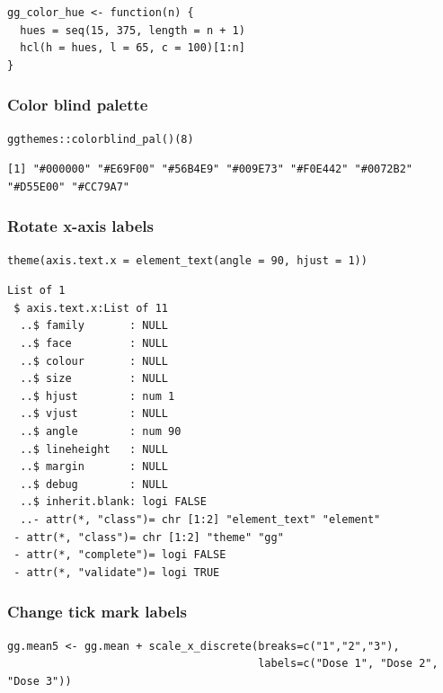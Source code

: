 \documentclass{article}
\begin{document}
\lstset{language=r,label= ,caption= ,captionpos=b,numbers=none}
\begin{lstlisting}
gg_color_hue <- function(n) {
  hues = seq(15, 375, length = n + 1)
  hcl(h = hues, l = 65, c = 100)[1:n]
}
\end{lstlisting}

\subsubsection{Color blind palette}
\label{sec:orgf4b45dc}
\lstset{language=r,label= ,caption= ,captionpos=b,numbers=none}
\begin{lstlisting}
ggthemes::colorblind_pal()(8)
\end{lstlisting}

\begin{verbatim}
[1] "#000000" "#E69F00" "#56B4E9" "#009E73" "#F0E442" "#0072B2" "#D55E00" "#CC79A7"
\end{verbatim}

\subsubsection{Rotate x-axis labels}
\label{sec:orgc3f6c24}
\lstset{language=r,label= ,caption= ,captionpos=b,numbers=none}
\begin{lstlisting}
theme(axis.text.x = element_text(angle = 90, hjust = 1))
\end{lstlisting}

\begin{verbatim}
List of 1
 $ axis.text.x:List of 11
  ..$ family       : NULL
  ..$ face         : NULL
  ..$ colour       : NULL
  ..$ size         : NULL
  ..$ hjust        : num 1
  ..$ vjust        : NULL
  ..$ angle        : num 90
  ..$ lineheight   : NULL
  ..$ margin       : NULL
  ..$ debug        : NULL
  ..$ inherit.blank: logi FALSE
  ..- attr(*, "class")= chr [1:2] "element_text" "element"
 - attr(*, "class")= chr [1:2] "theme" "gg"
 - attr(*, "complete")= logi FALSE
 - attr(*, "validate")= logi TRUE
\end{verbatim}

\subsubsection{Change tick mark labels}
\label{sec:org61b51de}

\lstset{language=r,label= ,caption= ,captionpos=b,numbers=none}
\begin{lstlisting}
gg.mean5 <- gg.mean + scale_x_discrete(breaks=c("1","2","3"),
									   labels=c("Dose 1", "Dose 2", "Dose 3"))
\end{lstlisting}
\end{document}
